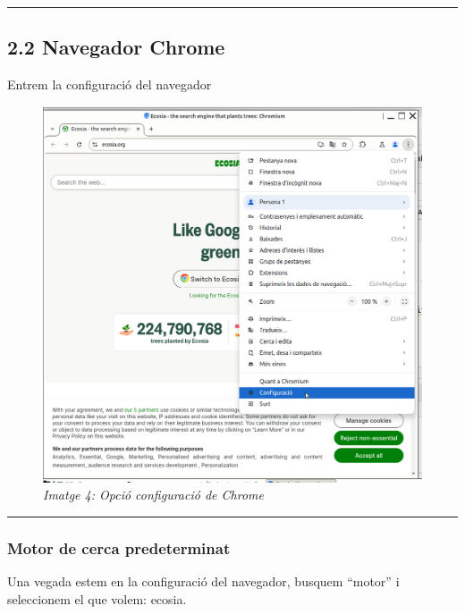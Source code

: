 \documentclass[
  a4paper,
]{article}
\begin{document}
\begin{center}\rule{0.5\linewidth}{0.5pt}\end{center}

\subsection{2.2 Navegador Chrome}\label{navegador-chrome}

Entrem la configuració del navegador

\begin{figure}
\centering
\includegraphics{png/1-Chrome-Configuracio.png}
\caption{\emph{Imatge 4: Opció configuració de Chrome}}
\end{figure}

\begin{center}\rule{0.5\linewidth}{0.5pt}\end{center}

\subsubsection{Motor de cerca
predeterminat}\label{motor-de-cerca-predeterminat-1}

Una vegada estem en la configuració del navegador, busquem ``motor'' i
seleccionem el que volem: ecosia.
\end{document}
